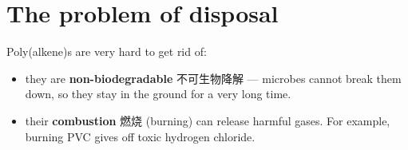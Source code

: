 \documentclass[11pt]{article}
\begin{document}
\section*{The problem of disposal}

Poly(alkene)s are very hard to get rid of:

\begin{itemize}
\item they are \textbf{non-biodegradable} 不可生物降解 — microbes cannot break them down, so they stay in the ground for a very long time.

\item their \textbf{combustion} 燃烧 (burning) can release harmful gases. For example, burning PVC gives off toxic hydrogen chloride.

\end{itemize}
\end{document}
